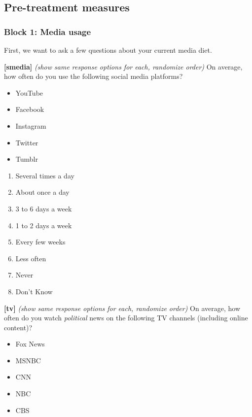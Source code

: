 \documentclass[
]{article}
\providecommand{\tightlist}{%
  \setlength{\itemsep}{0pt}\setlength{\parskip}{0pt}}
\begin{document}
\hypertarget{pre-treatment-measures}{%
\subsection{Pre-treatment measures}\label{pre-treatment-measures}}

\hypertarget{block-1-media-usage}{%
\subsubsection{Block 1: Media usage}\label{block-1-media-usage}}

First, we want to ask a few questions about your current media diet.

\textbf{{[}smedia{]}} \emph{(show same response options for each,
randomize order)} On average, how often do you use the following social
media platforms?

\begin{itemize}
\tightlist
\item
  YouTube
\item
  Facebook
\item
  Instagram
\item
  Twitter
\item
  Tumblr
\end{itemize}

\begin{enumerate}
\def\labelenumi{\arabic{enumi}.}
\tightlist
\item
  Several times a day
\item
  About once a day
\item
  3 to 6 days a week
\item
  1 to 2 days a week
\item
  Every few weeks
\item
  Less often
\item
  Never
\item
  Don't Know
\end{enumerate}

\textbf{{[}tv{]}} \emph{(show same response options for each, randomize
order)} On average, how often do you watch \emph{political} news on the
following TV channels (including online content)?

\begin{itemize}
\tightlist
\item
  Fox News
\item
  MSNBC
\item
  CNN
\item
  NBC
\item
  CBS
\end{itemize}
\end{document}
